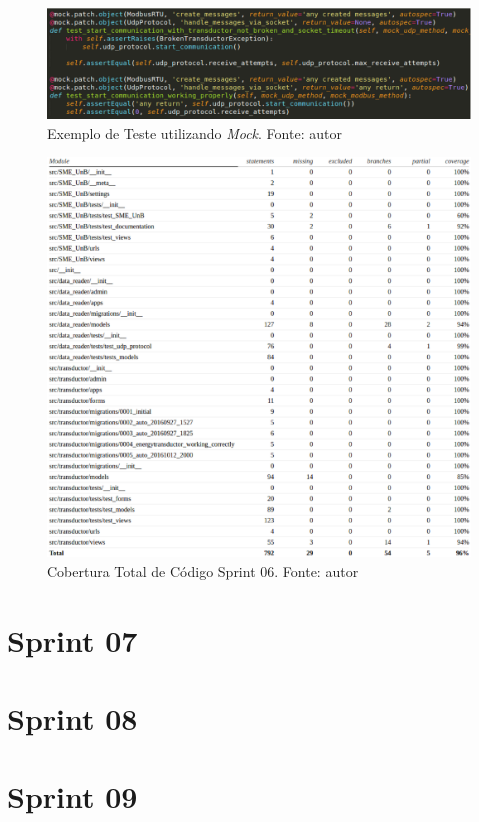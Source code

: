 \begin{figure}[!htpb]
    \centering
    \includegraphics[keepaspectratio=true,scale=0.5]{figuras/exemplo_mock.eps}
    \caption{Exemplo de Teste utilizando \textit{Mock}. Fonte: autor}
    \label{exemplo_mock}
\end{figure}

\begin{figure}[!htpb]
    \centering
    \includegraphics[keepaspectratio=true,scale=0.5]{figuras/cobertura03.eps}
    \caption{Cobertura Total de Código Sprint 06. Fonte: autor}
    \label{cobertura03}
\end{figure}

\section{Sprint 07}

\section{Sprint 08}

\section{Sprint 09}

